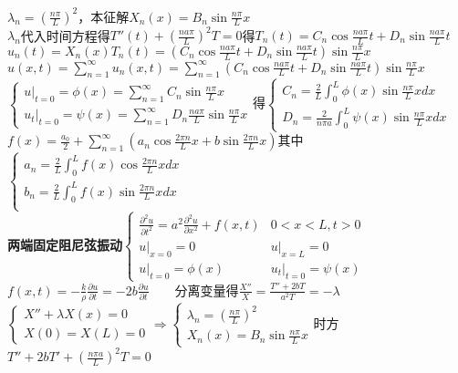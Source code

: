 \documentclass[10pt,a4paper]{article}
\begin{document}
\begin{multicols}{2}
\indent{}$\lambda_n=(\frac{n\pi}{L})^2$，本征解$X_n(x)=B_n\sin\frac{n\pi}{L}x$\\
\indent$\lambda_n$代入时间方程得$T''(t)+(\frac{na\pi}{L})^2T=0$得$T_n(t)=C_n\cos\frac{na\pi}{L}t+D_n\sin\frac{na\pi}{L}t$\\
$u_n(t)=X_n(x)T_n(t)=(C_n\cos\frac{na\pi}{L}t+D_n\sin\frac{na\pi}{L}t)\sin\frac{n\pi}{L}x$\\
$u(x,t)=\sum_{n=1}^{\infty}u_n(x,t)=\sum_{n=1}^{\infty}(C_n\cos\frac{na\pi}{L}t+D_n\sin\frac{na\pi}{L}t)\sin\frac{n\pi}{L}x$\\
$\left\{\begin{array}{l}u|_{t=0}=\phi(x)=\sum_{n=1}^{\infty}C_n\sin\frac{n\pi}{L}x\\u_t|_{t=0}=\psi(x)=\sum_{n=1}^{\infty}D_n\frac{na\pi}{L}\sin\frac{n\pi}{L}x\end{array}\right.$得$\left\{\begin{array}{l}C_n=\frac{2}{L}\int_0^L\phi(x)\sin\frac{n\pi}{L}xdx\\D_n=\frac{2}{n\pi a}\int_0^L\psi(x)\sin\frac{n\pi}{L}xdx\end{array}\right.$\\
\indent{}$f(x)=\frac{a_0}{2}+\sum_{n=1}^{\infty}(a_n\cos\frac{2\pi n}{L}x+b\sin\frac{2\pi n}{L}x)$其中$\left\{\begin{array}{l}a_n=\frac{2}{L}\int_0^{L}f(x)\cos\frac{2\pi n}{L}xdx\\b_n=\frac{2}{L}\int_0^{L}f(x)\sin\frac{2\pi n}{L}xdx\\\end{array}\right.$\\
\textbf{两端固定阻尼弦振动}$\left\{\begin{array}{ll}\frac{\partial^2u}{\partial t^2}=a^2\frac{\partial^2u}{\partial x^2}+f(x,t)&0<x<L,t>0\\u|_{x=0}=0&u|_{x=L}=0\\u|_{t=0}=\phi(x)&u_t|_{t=0}=\psi(x)\end{array}\right.$\\
$f(x,t)=-\frac{k}{\rho}\frac{\partial u}{\partial t}=-2b\frac{\partial u}{\partial t}$~~~~分离变量得$\frac{X''}{X}=\frac{T''+2bT}{a^2T}=-\lambda$\\
$\left\{\begin{array}{l}X''+\lambda X(x)=0\\X(0)=X(L)=0\end{array}\right.\Longrightarrow\left\{\begin{array}{l}\lambda_n=(\frac{n\pi}{L})^2\\X_n(x)=B_n\sin\frac{n\pi}{L}x\end{array}\right.$时方$T''+2bT'+(\frac{n\pi a}{L})^2T=0$\\

\end{multicols}
\end{document}
